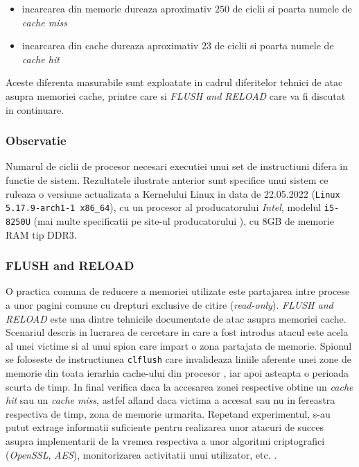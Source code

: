 \begin{itemize}
  \setlength\itemsep{0em}
  \item incarcarea din memorie dureaza aproximativ $250$ de ciclii si poarta
    numele de \emph{cache miss}
  \item incarcarea din cache dureaza aproximativ $23$ de ciclii si poarta
    numele de \emph{cache hit}
\end{itemize}

Aceste diferenta masurabile sunt exploatate in cadrul diferitelor
tehnici de atac asupra memoriei cache, printre care si \emph{FLUSH and RELOAD}
care va fi discutat in continuare.

\subsubsection{Observatie}

Numarul de ciclii de procesor necesari executiei unui set de instructiuni
difera in functie de sistem. Rezultatele ilustrate anterior sunt specifice unui
sistem ce ruleaza o versiune actualizata a Kernelului Linux in data de
22.05.2022 (\texttt{Linux 5.17.9-arch1-1 x86\_64}), cu un procesor al
producatorului \emph{Intel}, modelul \texttt{i5-8250U} (mai multe specificatii
pe site-ul producatorului \cite{i5_8250U}), cu 8GB de memorie RAM tip DDR3.



\subsubsection{FLUSH and RELOAD}\label{sec:flush_reload}

O practica comuna de reducere a memoriei utilizate este partajarea intre
procese a unor pagini comune cu drepturi exclusive de citire
(\emph{read-only}). \emph{FLUSH and RELOAD} este una dintre tehnicile
documentate de atac asupra memoriei cache. Scenariul descris in lucrarea de
cercetare in care a fost introdus atacul este acela al unei victime si al unui
spion care impart o zona partajata de memorie. Spionul se foloseste de
instructiunea \texttt{clflush} care invalideaza liniile aferente unei zone de
memorie din toata ierarhia cache-ului din procesor \cite{clflush}, iar apoi
asteapta o perioada scurta de timp. In final verifica daca la accesarea zonei
respective obtine un \emph{cache hit} sau un \emph{cache miss}, astfel afland
daca victima a accesat sau nu in fereastra respectiva de timp, zona de memorie
urmarita. Repetand experimentul, s-au putut extrage informatii suficiente
pentru realizarea unor atacuri de succes asupra implementarii de la vremea
respectiva a unor algoritmi criptografici (\emph{OpenSSL}, \emph{AES}),
monitorizarea activitatii unui utilizator, etc. \cite{flush_reload}.

